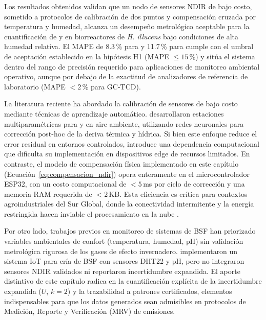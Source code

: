 
Los resultados obtenidos validan que un nodo de sensores NDIR de bajo
costo, sometido a protocolos de calibración de dos puntos y compensación
cruzada por temperatura y humedad, alcanza un desempeño metrológico
aceptable para la cuantificación de  y  en biorreactores
de \textit{H. illucens} bajo condiciones de alta humedad relativa. El
MAPE de 8.3\,\% para  y 11.7\,\% para  cumple con el
umbral de aceptación establecido en la hipótesis H1 (MAPE $\leq 15$\,\%)
y sitúa el sistema dentro del rango de precisión requerido para
aplicaciones de monitoreo ambiental operativo, aunque por debajo de la
exactitud de analizadores de referencia de laboratorio (MAPE $< 2$\,\%
para GC-TCD).

La literatura reciente ha abordado la calibración de sensores de bajo
costo mediante técnicas de aprendizaje automático. \textcite{biagiDevelopmentMachineLearningbased2024a} desarrollaron estaciones
multiparamétricas para  y  en aire ambiente, utilizando
redes neuronales para corrección post-hoc de la deriva térmica y
hídrica. Si bien este enfoque reduce el error residual en entornos
controlados, introduce una dependencia computacional que dificulta su
implementación en dispositivos edge de recursos limitados. En contraste,
el modelo de compensación física implementado en este capítulo
(Ecuación~\ref{eq:compensacion_ndir}) opera enteramente en el
microcontrolador ESP32, con un costo computacional de $< 5$\,ms por
ciclo de corrección y una memoria RAM requerida de $< 2$\,KB. Esta
eficiencia es crítica para contextos agroindustriales del Sur Global,
donde la conectividad intermitente y la energía restringida hacen
inviable el procesamiento en la nube \autocite{duobieneDevelopmentWirelessSensor2022}.

Por otro lado, trabajos previos en monitoreo de sistemas de BSF han
priorizado variables ambientales de confort (temperatura, humedad, pH)
sin validación metrológica rigurosa de los gases de efecto invernadero.
\textcite{vanIntegrationInternetofThingsSustainable2022a} implementaron
un sistema IoT para cría de BSF con sensores DHT22 y pH, pero no
integraron sensores NDIR validados ni reportaron incertidumbre
expandida. El aporte distintivo de este capítulo radica en la
cuantificación explícita de la incertidumbre expandida ($U$, $k=2$)
y la trazabilidad a patrones certificados, elementos indispensables
para que los datos generados sean admisibles en protocolos de
Medición, Reporte y Verificación (MRV) de emisiones.

